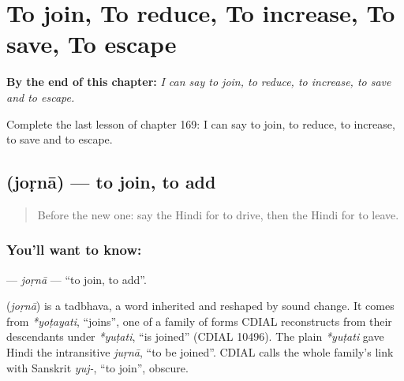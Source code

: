 
\chapter{To join, To reduce, To increase, To save, To escape}
\label{ch:hi-to-join-to-reduce-to-increase-to-save-to-escape}

\begin{chapteropening}
\textbf{By the end of this chapter:} \emph{I can say to join, to reduce, to increase, to save and to escape.}

Complete the last lesson of chapter 169: I can say to join, to reduce, to increase, to save and to escape.
\end{chapteropening}

\section[\texorpdfstring{\hi{जोड़ना} (joṛnā)}{जोड़ना (joṛnā)}]{ (joṛnā) — to join, to add}

\label{lesson:HI-C169-jorna}



\begin{quote}
Before the new one: say the Hindi for to drive, then the Hindi for to leave.
\end{quote}

\subsection*{You'll want to know: }
\textbf{} — \emph{joṛnā} — \textquotedblleft{}to join, to add\textquotedblright{}.

\begin{cousinweb}
\textbf{} (\emph{joṛnā}) is a tadbhava, a word inherited and reshaped by sound change. It comes from \emph{*yoṭayati}, \textquotedblleft{}joins\textquotedblright{}, one of a family of forms CDIAL reconstructs from their descendants under \emph{*yuṭati}, \textquotedblleft{}is joined\textquotedblright{} (CDIAL 10496). The plain \emph{*yuṭati} gave Hindi the intransitive \emph{juṛnā}, \textquotedblleft{}to be joined\textquotedblright{}. CDIAL calls the whole family's link with Sanskrit \emph{yuj-}, \textquotedblleft{}to join\textquotedblright{}, obscure.
\end{cousinweb}

